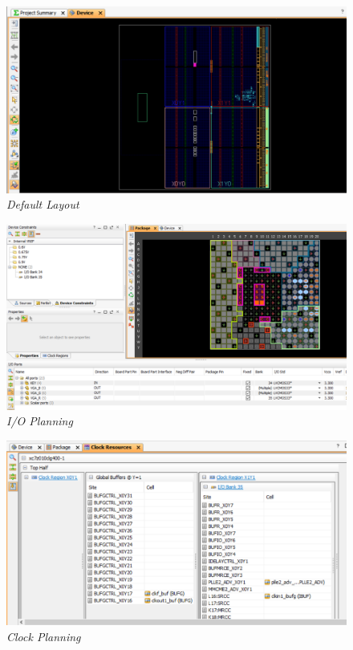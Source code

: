 \begin{figure}[H]
    \centering
    \includegraphics[width = 1\textwidth]{imagenes/default.png}
    \caption{\textit{Default Layout}}\label{default}
\end{figure}

\begin{figure}[H]
    \centering
    \includegraphics[width = 1\textwidth]{imagenes/io.png}
    \caption{\textit{I/O Planning}}\label{io}
\end{figure}

\begin{figure}[H]
    \centering
    \includegraphics[width = 1\textwidth]{imagenes/clock.png}
    \caption{\textit{Clock Planning}}\label{clock}
\end{figure}

